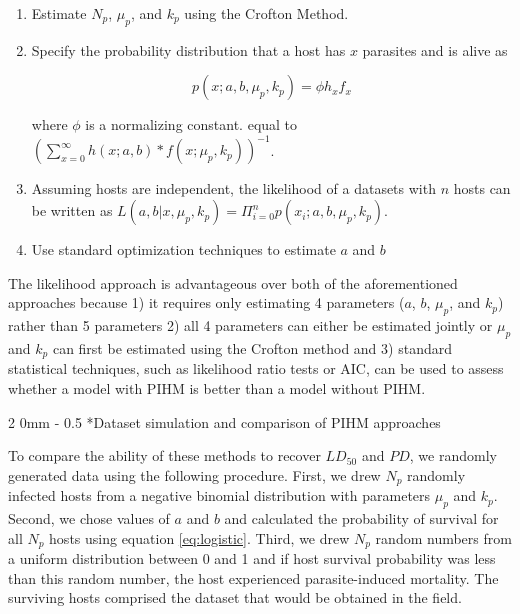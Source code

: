 \documentclass[12pt, a4paper]{article}
\makeatletter
\renewcommand{\subsection}{\@startsection
{subsection}%
{2}%
{0mm}%
{-\baselineskip}%
{0.5\baselineskip}%
{\normalfont\bf}} %
\makeatother
\begin{document}
\singlespacing
\begin{enumerate}
    \item Estimate $N_p$, $\mu_p$, and $k_p$ using the Crofton Method.
    \item Specify the probability distribution that a host has $x$ parasites and is alive as

    \begin{equation}
        p(x; a, b, \mu_p, k_p) = \phi h_x f_x
    \end{equation}

    where $\phi$ is a normalizing constant. equal to $(\sum_{x=0}^\infty h(x; a, b) * f(x; \mu_p, k_p))^{-1}$.

    \item Assuming hosts are independent, the likelihood of a datasets with $n$ hosts can be written as $L(a, b | x, \mu_p, k_p) = \Pi_{i=0}^n p(x_i ; a, b, \mu_p, k_p)$.

    \item Use standard optimization techniques to estimate $a$ and $b$

\end{enumerate}

\doublespacing
The likelihood approach is advantageous over both of the aforementioned approaches because 1) it requires only estimating 4 parameters ($a$, $b$, $\mu_p$, and $k_p$) rather than 5 parameters 2) all 4 parameters can either be estimated jointly or $\mu_p$ and $k_p$ can first be estimated using the Crofton method and 3) standard statistical techniques, such as likelihood ratio tests or AIC, can be used to assess whether a model with PIHM is better than a model without PIHM.

\subsection*{Dataset simulation and comparison of PIHM approaches}

To compare the ability of these methods to recover $LD_{50}$ and $PD$, we randomly generated data using the
following procedure.  First, we drew $N_p$ randomly infected hosts from a
negative binomial distribution with parameters $\mu_p$ and $k_p$.  Second, we chose values of $a$ and $b$ and calculated the probability of survival
for all $N_p$ hosts using equation \ref{eq:logistic}.  Third, we drew $N_p$ random numbers from a uniform distribution
between 0 and 1 and if host survival probability was less than this random
number, the host experienced parasite-induced mortality.  The surviving
hosts comprised the dataset that would be obtained in the field.
\end{document}
